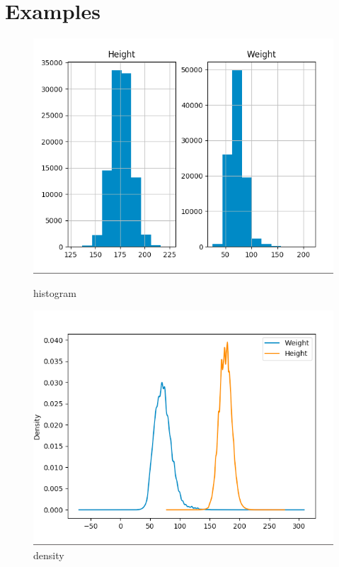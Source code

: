 \documentclass{42-en}
\begin{document}
\section*{Examples}

\begin{figure}[h!]
  \begin{minipage}[l]{0.49\linewidth}
    \includegraphics[scale=0.39]{assets/ex06_histogram.png}
    \caption{histogram}
  \end{minipage}
  \hfill
  \begin{minipage}[c]{0.49\linewidth}
    \includegraphics[scale=0.39]{assets/ex06_density.png}
    \caption{density}
  \end{minipage}
  

\end{figure}
\end{document}
